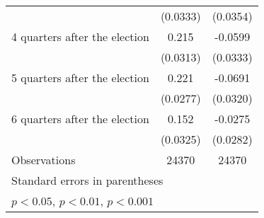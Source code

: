 \begin{table}[htbp]
\begin{tabular}{l*{2}{c}}
                    &    (0.0333)         &    (0.0354)         \\
[1em]
 4 quarters after the election&       0.215\sym{***}&     -0.0599         \\
                    &    (0.0313)         &    (0.0333)         \\
[1em]
 5 quarters after the election&       0.221\sym{***}&     -0.0691\sym{*}  \\
                    &    (0.0277)         &    (0.0320)         \\
[1em]
 6 quarters after the election&       0.152\sym{***}&     -0.0275         \\
                    &    (0.0325)         &    (0.0282)         \\
\hline
Observations        &       24370         &       24370         \\
\hline\hline
\multicolumn{3}{l}{\footnotesize Standard errors in parentheses}\\
\multicolumn{3}{l}{\footnotesize \sym{*} \(p<0.05\), \sym{**} \(p<0.01\), \sym{***} \(p<0.001\)}\\
\end{tabular}
\end{table}
